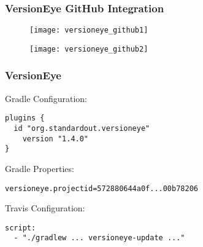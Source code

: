 \begin{frame} \frametitle{VersionEye GitHub Integration} 


\begin{figure}[h]
\centering
  \texttt{[image: versioneye\_github1]}
\end{figure}
\begin{figure}[h]
\centering
  \texttt{[image: versioneye\_github2]}
\end{figure}
\end{frame}



\begin{frame}[fragile] \frametitle{VersionEye} 
Gradle Configuration:
\begin{lstlisting}
plugins {
  id "org.standardout.versioneye"
    version "1.4.0"
}
\end{lstlisting}
\pause

Gradle Properties:
\begin{lstlisting}
versioneye.projectid=572880644a0f...00b78206
\end{lstlisting}
\pause


Travis Configuration:

\begin{lstlisting}
script:
  - "./gradlew ... versioneye-update ..."
\end{lstlisting}
 
\end{frame}
